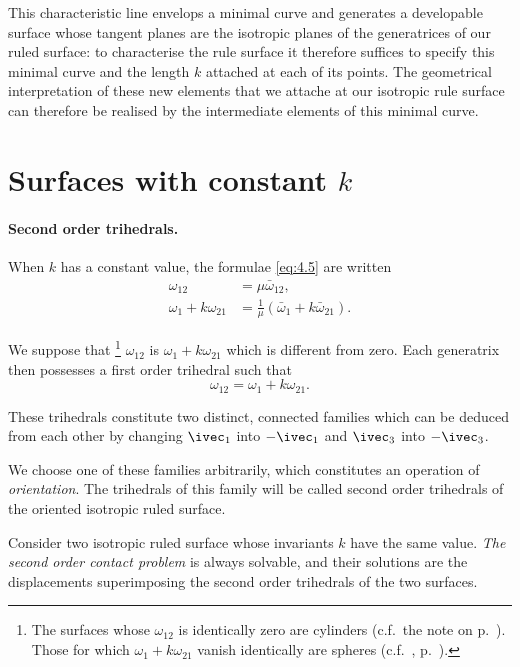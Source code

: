 This characteristic line envelops a minimal curve and generates a developable surface whose tangent planes are the isotropic planes of the generatrices of our ruled surface: to characterise the rule surface it therefore suffices to specify this minimal curve and the length $k$ attached at each of its points. The geometrical interpretation of these new elements  that we attache at our isotropic rule surface can therefore be realised by the intermediate elements of this minimal curve.

\section{Surfaces with constant $k$}
\label{sec:surf-with-const}

\paragraph{Second order trihedrals.}
\label{sec:53}
When $k$ has a constant value, the formulae \eqref{eq:4.5} are written
\begin{align*}
  \omega_{12}&=\mu\bar\omega_{12},\\
  \omega_{1}+k\omega_{21}&=\frac{1}{\mu}(\bar\omega_{1}+k\bar\omega_{21}).
\end{align*}

We suppose that \footnote{The surfaces whose $\omega_{12}$ is identically zero are cylinders (c.f.~the note on p.~\pageref{sec:50}). Those for which $\omega_{1}+k\omega_{21}$ vanish identically are spheres (c.f.~, p.~\pageref{sec:51}).} $\omega_{12}$ is $\omega_{1}+k\omega_{21}$ which is different from zero. Each generatrix then possesses a first order trihedral such that
\begin{equation}
  \label{eq:4.8}
  \omega_{12}=\omega_{1}+k\omega_{21}.
\end{equation}

These trihedrals constitute two distinct, connected families which can be deduced from each other by changing $\ivec_{1}$ into $-\ivec_{1}$ and $\ivec_{3}$ into $-\ivec_{3}$.

We choose one of these families arbitrarily, which constitutes an operation of \emph{orientation}. The trihedrals of this family will be called second order trihedrals of the oriented isotropic ruled surface.

Consider two isotropic ruled surface whose invariants $k$ have the same value. \emph{The second order contact problem} is always solvable, and their solutions are the displacements superimposing the second order trihedrals of the two surfaces.

